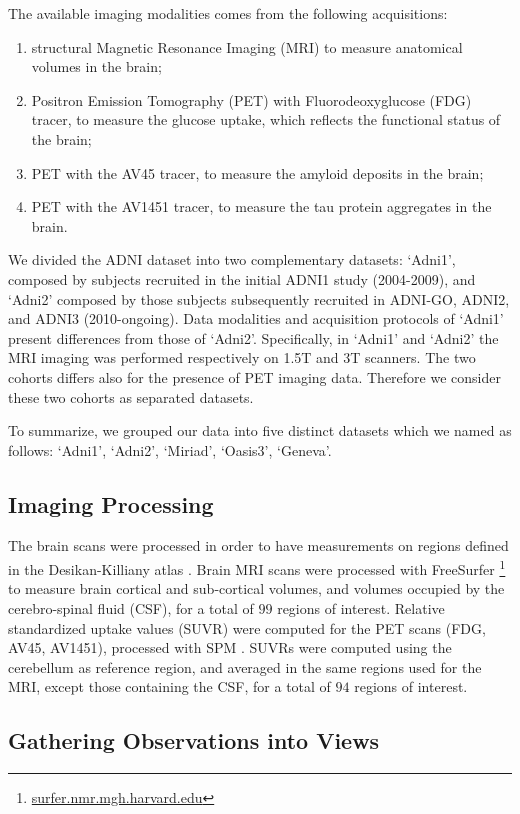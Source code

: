 The available imaging modalities comes from the following acquisitions:
%
\begin{enumerate}
\item structural Magnetic Resonance Imaging (MRI) to measure anatomical volumes in the brain;
%
\item Positron Emission Tomography (PET) with Fluorodeoxyglucose (FDG) tracer, to measure the glucose uptake, which reflects the functional status of the brain;
\item PET with the AV45 tracer, to measure the amyloid deposits in the brain;
\item PET with the AV1451 tracer, to measure the tau protein aggregates in the brain.
\end{enumerate}
%

We divided the ADNI dataset into two complementary datasets:
`Adni1', composed by subjects recruited in the initial ADNI1 study (2004-2009),
and `Adni2' composed by those subjects subsequently recruited in ADNI-GO, ADNI2, and ADNI3 (2010-ongoing).
Data modalities and acquisition protocols of `Adni1' present differences from those of `Adni2'.
Specifically, in `Adni1' and `Adni2' the MRI imaging was performed respectively on 1.5T and 3T scanners.
The two cohorts differs also for the presence of PET imaging data.
Therefore we consider these two cohorts as separated datasets.

To summarize, we grouped our data into five distinct datasets which we named as follows: `Adni1', `Adni2', `Miriad', `Oasis3', `Geneva'.

\subsection{Imaging Processing}
The brain scans were processed in order to have measurements on regions defined in the Desikan-Killiany atlas \citep{Desikan2006}.
Brain MRI scans were processed with FreeSurfer \footnote{\href{https://surfer.nmr.mgh.harvard.edu/}{surfer.nmr.mgh.harvard.edu}} \citep{freesurfer} to measure brain cortical and sub-cortical volumes, and volumes occupied by the cerebro-spinal fluid (CSF), for a total of $99$ regions of interest.
Relative standardized uptake values (SUVR) were computed for the PET scans (FDG, AV45, AV1451), processed with SPM \citep{Ashburner2000}.
SUVRs were computed using the cerebellum as reference region, and averaged in the same regions used for the MRI, except those containing the CSF, for a total of $94$ regions of interest.

\subsection{Gathering Observations into Views}
\label{ssec:views}


